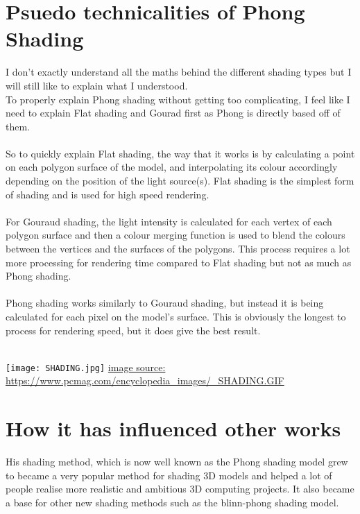 \documentclass{scrartcl}
\begin{document}
\section{Psuedo technicalities of Phong Shading}
I don't exactly understand all the maths behind the different shading types but I will still like to explain what I understood.\\
To properly explain Phong shading without getting too complicating, I feel like I need to explain Flat shading and Gourad first as Phong is directly based off of them.
\\~\\
So to quickly explain Flat shading, the way that it works is by calculating a point on each polygon surface of the model, and interpolating its colour accordingly depending on the position of the light source(s).
Flat shading is the simplest form of shading and is used for high speed rendering.
\\~\\
For Gouraud shading, the light intensity is calculated for each vertex  of each polygon surface and then a colour merging function is used to blend the colours between the vertices and the surfaces of the polygons. This process requires a lot more processing for rendering time compared to Flat shading but not as much as Phong shading.\cite{one}\cite{six}
\\~\\
Phong shading works similarly to Gouraud shading, but instead it is being calculated for each pixel on the model's surface. This is obviously the longest to process for rendering speed, but it does give the best result.\cite{one}\cite{six}
\\~\\
\begin{center}
\texttt{[image: SHADING.jpg]}
{\footnotesize \url{image source: https://www.pcmag.com/encyclopedia_images/_SHADING.GIF}}
\end{center}

\section{How it has influenced other works}
His shading method, which is now well known as the Phong shading model grew to became a very popular method for shading 3D models and helped a lot of people realise more realistic and ambitious 3D computing projects. It also became a base for other new shading methods such as the blinn-phong shading model.
\end{document}
